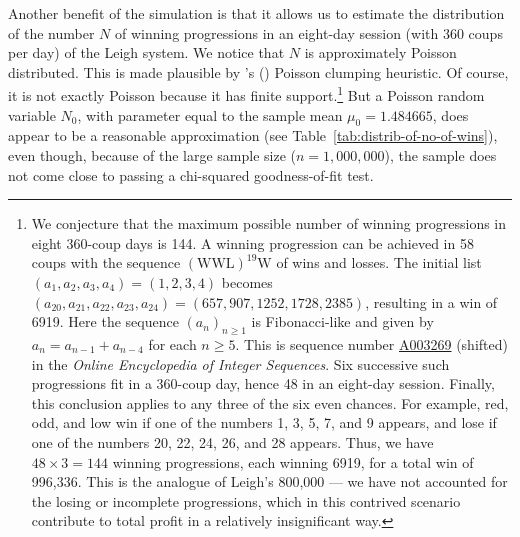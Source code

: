 \documentclass{article}
\theoremstyle{definition}
\theoremstyle{remark}
\begin{document}
Another benefit of the simulation is that it allows us to estimate the distribution of the number $N$ of winning progressions in an eight-day session (with 360 coups per day) of the Leigh system.  We notice that $N$ is approximately Poisson distributed.  This is made plausible by \citeauthor{A89}'s (\citeyear{A89}) Poisson clumping heuristic.  Of course, it is not exactly Poisson because it has finite support.\footnote{We conjecture that the maximum possible number of winning progressions in eight 360-coup days is 144.  A winning progression can be achieved in 58 coups with the sequence $(\text{WWL})^{19}\text{W}$ of wins and losses.  The initial list $(a_1,a_2,a_3,a_4)=(1,2,3,4)$ becomes $(a_{20},a_{21},a_{22},a_{23},a_{24})=(657,907,1252,1728,2385)$, resulting in a win of 6919.  Here the sequence $(a_n)_{n\ge1}$ is Fibonacci-like and given by $a_n=a_{n-1}+a_{n-4}$ for each $n\ge5$.  This is sequence number \href{https://oeis.org/A003269}{A003269} (shifted) in the \textit{Online Encyclopedia of Integer Sequences}.  Six successive such progressions fit in a 360-coup day, hence 48 in an eight-day session.  Finally, this conclusion applies to any three of the six even chances.  For example, red, odd, and low win if one of the numbers 1, 3, 5, 7, and 9 appears, and lose if one of the numbers 20, 22, 24, 26, and 28 appears.  Thus, we have $48\times3=144$ winning progressions, each winning 6919, for a total win of 996,336.  This is the analogue of Leigh's 800,000 --- we have not accounted for the losing or incomplete progressions, which in this contrived scenario contribute to total profit in a relatively insignificant way.}  But a Poisson random variable $N_0$, with parameter equal to the sample mean $\mu_0=1.484665$, does appear to be a reasonable approximation (see Table~\ref{tab:distrib-of-no-of-wins}), even though, because of the large sample size ($n=1{,}000{,}000$), the sample does not come close to passing a chi-squared goodness-of-fit test.
\end{document}
